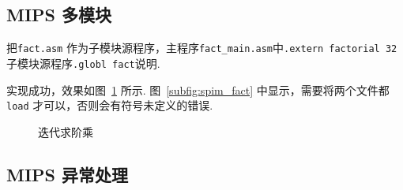 \documentclass[11pt]{SEU-Digital-Report}
\begin{document}
    \subsection{MIPS 多模块}

      把\texttt{fact.asm} 作为子模块源程序，主程序\texttt{fact\_main.asm}中\texttt{.extern factorial 32}
      子模块源程序\texttt{.globl fact}说明.

      实现成功，效果如图~\ref{fig:spim_fact} 所示.
      图~\ref{subfig:spim_fact} 中显示，需要将两个文件都 \texttt{load} 才可以，否则会有符号未定义的错误.

      \begin{figure}[htbp]
        \centering
        \caption{迭代求阶乘}
        \label{fig:spim_fact}
      \end{figure}

      \newpage

    \subsection{MIPS 异常处理}\label{subsec:exception}
\end{document}
